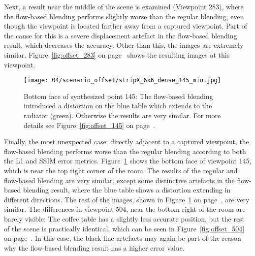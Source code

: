 Next, a result near the middle of the scene is examined (Viewpoint 283), where the flow-based blending performs slightly worse than the regular blending, even though the viewpoint is located farther away from a captured viewpoint. Part of the cause for this is a severe displacement artefact in the flow-based blending result, which decreases the accuracy. Other than this, the images are extremely similar. Figure~\ref{fig:offset_283} on page~\pageref{fig:offset_283} shows the resulting images at this viewpoint.

\begin{figure}
  \centering
  \texttt{[image: 04/scenario\_offset/stripX\_6x6\_dense\_145\_min.jpg]}
  \caption[Bottom face of viewpoint 145 of 625 in the square room]{Bottom face of synthesized point 145: The flow-based blending introduced a distortion on the blue table which extends to the radiator (green). Otherwise the results are very similar. For more details see Figure~\ref{fig:offset_145} on page~\pageref{fig:offset_145}.}
  \label{fig:offset_145_min}
\end{figure}

Finally, the most unexpected case: directly adjacent to a captured viewpoint, the flow-based blending performs worse than the regular blending according to both the L1 and SSIM error metrics. Figure~\ref{fig:offset_145_min} shows the bottom face of viewpoint 145, which is near the top right corner of the room. The results of the regular and flow-based blending are very similar, except some distinctive artefacts in the flow-based blending result, where the blue table shows a distortion extending in different directions. The rest of the images, shown in Figure~\ref{fig:offset_145_min} on page~\pageref{fig:offset_145}, are very similar.
The differences in viewpoint 504, near the bottom right of the room are barely visible: The coffee table has a slightly less accurate position, but the rest of the scene is practically identical, which can be seen in Figure~\ref{fig:offset_504} on page~\pageref{fig:offset_504}. In this case, the black line artefacts may again be part of the reason why the flow-based blending result has a higher error value.



